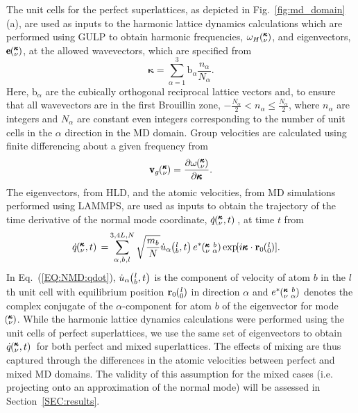\documentclass[aps,prb,preprint,preprintnumbers,amsmath,amssymb,floatfix,superscriptaddress]{revtex4}
\newcommand{\EXP}[1]{\exp\mspace{-5.0mu}\left[#1\right]\mspace{-3.0mu}}
\newcommand{\SUM}[2]{\ifthenelse{\equal{#1}{0}}{\sum_{
\alpha_{#2},b_{#2},l_{#2}}^{3,4L,N}} {\ifthenelse{\equal{#1}{1}}{\sum_{
\alpha_{#2},b_{#2}}^{3,n}}{\sum_{\pmb{\kappa}#2,\nu#2}^{N,3n}}}}
\newcommand{\ab}[2]{\mspace{-4.0mu}\left(\mspace{-8.0mu}
\begin{smallmatrix}&\ifthenelse{\equal{#1}{}}{a}{#1} \\&\ifthenelse
{\equal{#2}{}}{b}{#2}\end{smallmatrix}\mspace{-3.0mu}\right)}
\newcommand{\kvba}{\mspace{-4.0mu}\left(\mspace{-8.0mu}
\begin{smallmatrix} &\pmb{\kappa} &b \\ &\nu &\alpha\end{smallmatrix}
\mspace{-3.0mu}\right)}
\newcommand{\kvt}{\mspace{-4.0mu}\left(\mspace{-8.0mu}
\begin{smallmatrix}&\pmb{\kappa} \\&\nu\end{smallmatrix}
\mspace{-2.0mu},t\right)}
\newcommand{\kv}{\mspace{-4.0mu}\left(\mspace{-8.0mu}
\begin{smallmatrix}&\pmb{\kappa} \\&\nu\end{smallmatrix}
\mspace{-3.0mu}\right)}
\newcommand{\lbt}{\mspace{-4.0mu}\left(\mspace{-8.0mu}
\begin{smallmatrix}&l \\&b\end{smallmatrix}\mspace{-2.0mu},t\right)}
\begin{document}
The unit cells for the perfect superlattices, as depicted in Fig.~\ref{fig:md_domain}(a), are used as inputs to the harmonic lattice dynamics calculations which are performed using GULP\cite{GULP} to obtain harmonic frequencies, $\omega_H \kv$, and eigenvectors, $ \pmb{\mathrm{e}} \kv$, at the allowed wavevectors, which are specified from
\begin{equation}\label{EQ:NMD:allowdkpt}
\pmb{\kappa} = \sum_{\alpha=1}^3 \pmb{\mathrm{b}}_{\alpha} \frac{n_{\alpha}}{N_{\alpha}}.
\end{equation}
Here, $\pmb{\mathrm{b}}_\alpha$ are the cubically orthogonal reciprocal lattice vectors and, to ensure that all wavevectors are in the first Brouillin zone, $ -\frac{N_\alpha}{2} < n_\alpha \le \frac {N_\alpha}{2}$, where $n_\alpha$ are integers and $N_\alpha$ are constant even integers corresponding to the number of unit cells in the $\alpha$ direction in the MD domain. Group velocities are calculated using finite differencing about a given frequency from \cite{ziman_electrons_2001}
\begin{equation}\label{EQ:NMD:vg}
\begin{split}
\pmb{\mathrm{v}}_{g}\kv=\frac{\partial \omega \kv}{\partial \pmb{\kappa}}.
\end{split}
\end{equation}
The eigenvectors, from HLD, and the atomic velocities, from MD simulations performed using LAMMPS,\cite{LAMMPS} are used as inputs to obtain the trajectory of the time derivative of the normal mode coordinate, $\dot{q}\kvt{}{}{}$, at time $t$ from
\begin{equation}\label{EQ:NMD:qdot}
\begin{split}
\dot{q}\kvt{}{}{}=&\SUM{0}{}\sqrt{\frac{m_b}{N}}\dot{u}_{\alpha}\lbt e^*\kvba\EXP{i\pmb{\kappa}\cdot\mathbf{r}_0\ab{l}{0}}.
\end{split}
\end{equation}
In Eq.~(\ref{EQ:NMD:qdot}), $\dot{u}_{\alpha}\lbt$ is the component of velocity of atom $b$ in the $l$th unit cell with equilibrium position $\mathbf{r}_0\ab{l}{0}$ in direction $\alpha$ and $e^*\kvba$ denotes the complex conjugate of the $\alpha$-component for atom $b$ of the eigenvector for mode  ~$\kv$. While the harmonic lattice dynamics calculations were performed using the unit cells of perfect superlattices, we use the same set of eigenvectors to obtain $\dot{q}\kvt{}{}{}$ for both perfect and mixed superlattices. The effects of mixing are thus captured through the differences in the atomic velocities between perfect and mixed MD domains. The validity of this assumption for the mixed cases (i.e. projecting onto an approximation of the normal mode) will be assessed in Section~\ref{SEC:results}.
\end{document}

